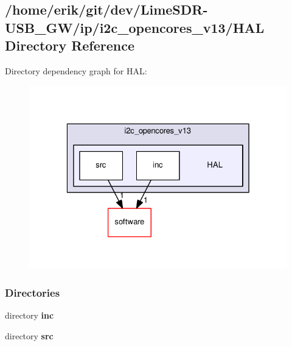 \subsection{/home/erik/git/dev/\+Lime\+S\+D\+R-\/\+U\+S\+B\+\_\+\+G\+W/ip/i2c\+\_\+opencores\+\_\+v13/\+H\+AL Directory Reference}
\label{dir_71161a78a7553301f8b506f2863bfc56}
Directory dependency graph for H\+AL\+:
\nopagebreak
\begin{figure}[H]
\begin{center}
\leavevmode
\includegraphics[width=326pt]{dir_71161a78a7553301f8b506f2863bfc56_dep}
\end{center}
\end{figure}
\subsubsection*{Directories}
\begin{DoxyCompactItemize}
\item 
directory {\bf inc}
\item 
directory {\bf src}
\end{DoxyCompactItemize}
